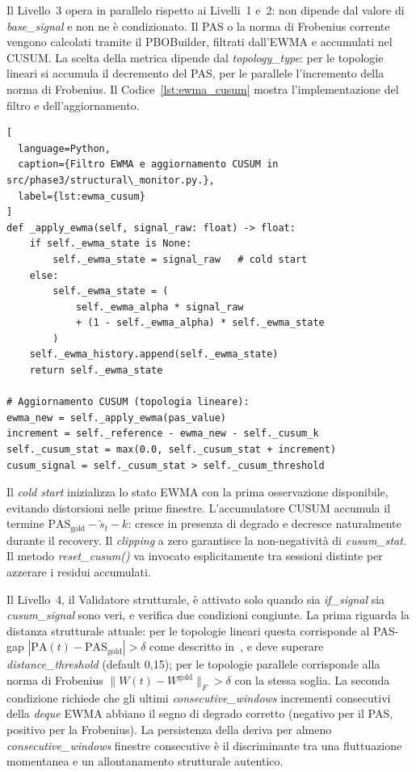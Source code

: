 Il Livello~3 opera in parallelo rispetto ai Livelli~1 e~2: non dipende dal valore di
\textit{base\_signal} e non ne è condizionato. Il \gls{PAS} o la norma di Frobenius corrente
vengono calcolati tramite il PBOBuilder, filtrati dall'\gls{EWMA} e accumulati nel \gls{CUSUM}.
La scelta della metrica dipende dal \textit{topology\_type}: per le topologie lineari si accumula
il decremento del \gls{PAS}, per le parallele l'incremento della norma di Frobenius. Il
Codice~\ref{lst:ewma_cusum} mostra l'implementazione del filtro e dell'aggiornamento.

\begin{lstlisting}[
  language=Python,
  caption={Filtro EWMA e aggiornamento CUSUM in src/phase3/structural\_monitor.py.},
  label={lst:ewma_cusum}
]
def _apply_ewma(self, signal_raw: float) -> float:
    if self._ewma_state is None:
        self._ewma_state = signal_raw   # cold start
    else:
        self._ewma_state = (
            self._ewma_alpha * signal_raw
            + (1 - self._ewma_alpha) * self._ewma_state
        )
    self._ewma_history.append(self._ewma_state)
    return self._ewma_state

# Aggiornamento CUSUM (topologia lineare):
ewma_new = self._apply_ewma(pas_value)
increment = self._reference - ewma_new - self._cusum_k
self._cusum_stat = max(0.0, self._cusum_stat + increment)
cusum_signal = self._cusum_stat > self._cusum_threshold
\end{lstlisting}

Il \textit{cold start} inizializza lo stato \gls{EWMA} con la prima osservazione disponibile,
evitando distorsioni nelle prime finestre. L'accumulatore \gls{CUSUM} accumula il termine
$\text{PAS}_{\text{gold}} - \tilde{s}_t - k$: cresce in presenza di degrado e decresce
naturalmente durante il recovery. Il \textit{clipping} a zero garantisce la non-negatività
di \textit{cusum\_stat}. Il metodo \textit{reset\_cusum()} va invocato esplicitamente tra
sessioni distinte per azzerare i residui accumulati.

Il Livello~4, il Validatore strutturale, è attivato solo quando sia \textit{if\_signal} sia
\textit{cusum\_signal} sono veri, e verifica due condizioni congiunte. La prima riguarda la distanza strutturale
attuale: per le topologie lineari questa corrisponde al
PAS-gap $|\text{PA}(t) - \text{PAS}_{\text{gold}}| > \delta$
come descritto in~\cite[§3.2.3]{methodology}, e deve superare \textit{distance\_threshold} (default 0,15);
per le topologie parallele corrisponde alla norma di Frobenius
$\|W(t) - W^{\text{gold}}\|_F > \delta$ con la stessa soglia.
La seconda condizione richiede che gli ultimi \textit{consecutive\_windows} incrementi consecutivi
della \textit{deque} \gls{EWMA} abbiano il segno di degrado corretto (negativo per il \gls{PAS},
positivo per la Frobenius). La persistenza della deriva per almeno
\textit{consecutive\_windows} finestre consecutive è il discriminante tra una fluttuazione
momentanea e un allontanamento strutturale autentico.

